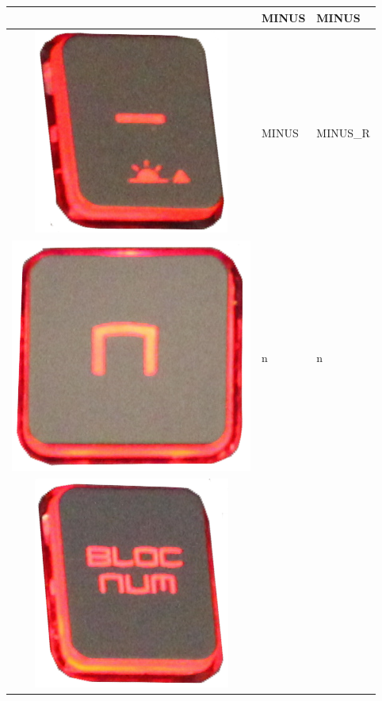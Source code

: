 \begin{longtable}{|cll|}
\begin{minipage}[c]{.4\textwidth}
\vspace{0.2cm}
\end{minipage} & MINUS & MINUS\\
\hline
\begin{minipage}[c]{.4\textwidth}
\vspace{0.2cm}
\includegraphics[scale=0.08]{Images/KeyMapping/MINUS_R}
\vspace{0.2cm}
\end{minipage} & MINUS & MINUS\_R\\
\hline
\begin{minipage}[c]{.4\textwidth}
\vspace{0.2cm}
\includegraphics[scale=0.08]{Images/KeyMapping/n}
\vspace{0.2cm}
\end{minipage} & n & n\\
\hline
\begin{minipage}[c]{.4\textwidth}
\vspace{0.2cm}
\includegraphics[scale=0.08]{Images/KeyMapping/NUM_LOCK}

\end{minipage}
\end{longtable}
